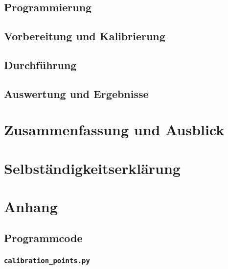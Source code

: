 \documentclass[a4paper,12pt]{report}
\begin{document}
	\section{Programmierung}\label{sec:programmierung}
		
	\section{Vorbereitung und Kalibrierung}
		
	\section{Durchführung}
		
	\section{Auswertung und Ergebnisse}
		
\chapter{Zusammenfassung und Ausblick}
	
	

\printbibliography[title={Literaturverzeichnis},heading=bibintoc]

\setcounter{secnumdepth}{-1} %

\chapter{Selbständigkeitserklärung}
	

\chapter{Anhang}%
	\section{Programmcode}%
		\subsection{\texttt{calibration\_points.py}}
			\inputminted[linenos,breaklines,tabsize=2,bgcolor=mybg,fontsize=\small]{python}{pretty_code/calibration_points.py}
\end{document}

